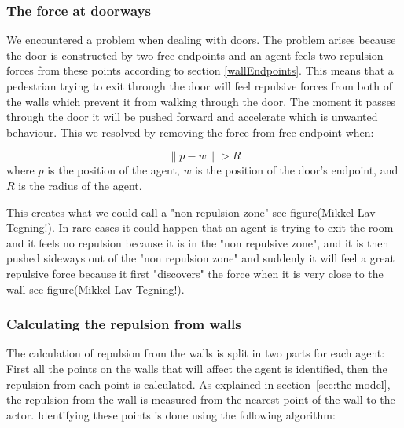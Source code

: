 \subsubsection{The force at doorways}
We encountered a problem when dealing with doors. The problem arises because 
the door is constructed by two free endpoints and an agent feels two repulsion 
forces from these points according to section \ref{wallEndpoints}. This means 
that a pedestrian trying to exit through the door will feel repulsive forces 
from both of the walls which prevent it from walking through the door. The moment it 
passes through the door it will be pushed forward and accelerate which is unwanted 
behaviour. This we resolved by removing the force from free endpoint when:

\begin{equation}
\| p - w \| > R
\end{equation}
where $ p $ is the position of the agent, $ w $ is the position of the door's endpoint, 
and $ R $ is the radius of the agent.

This creates what we could call a "non repulsion zone" see figure(Mikkel Lav Tegning!).
In rare cases it could happen that an agent is trying to exit the room and it feels 
no repulsion because it is in the "non repulsive zone", and it is then pushed sideways out 
of the "non repulsion zone" and suddenly it will feel a great repulsive force because 
it first "discovers" the force when it is very close to the wall see figure(Mikkel Lav Tegning!).

\subsubsection{Calculating the repulsion from walls}
\label{sec:repulsion-points}
The calculation of repulsion from the walls is split in two parts for each 
agent: First all the points on the walls that will affect the agent is 
identified, then the repulsion from each point is calculated. As explained in 
section~\ref{sec:the-model}, the repulsion from the wall is measured from the 
nearest point of the wall to the actor. Identifying these points is done using 
the following algorithm:

